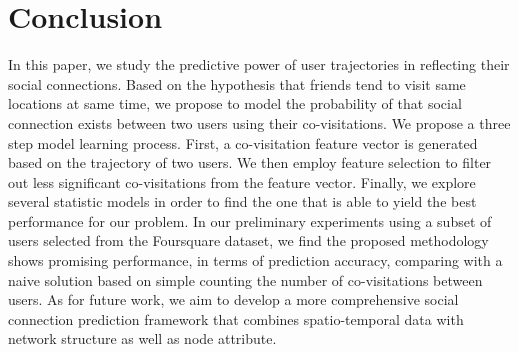 \section{Conclusion} \label{sec:conclusion}

In this paper, we study the predictive power of user trajectories in reflecting their social connections. Based on the hypothesis that friends tend to visit same locations at same time, we propose to model the probability of that social connection exists between two users using their co-visitations. We propose a three step model learning process. First, a co-visitation feature vector is generated based on the trajectory of two users. We then employ feature selection to filter out less significant co-visitations from the feature vector. Finally, we explore several statistic models in order to find the one that is able to yield the best performance for our problem. In our preliminary experiments using a subset of users selected from the Foursquare dataset, we find the proposed methodology shows promising performance, in terms of prediction accuracy, comparing with a naive solution based on simple counting the number of co-visitations between users. As for future work, we aim to develop a more comprehensive social connection prediction framework that combines spatio-temporal data with network structure as well as node attribute.

